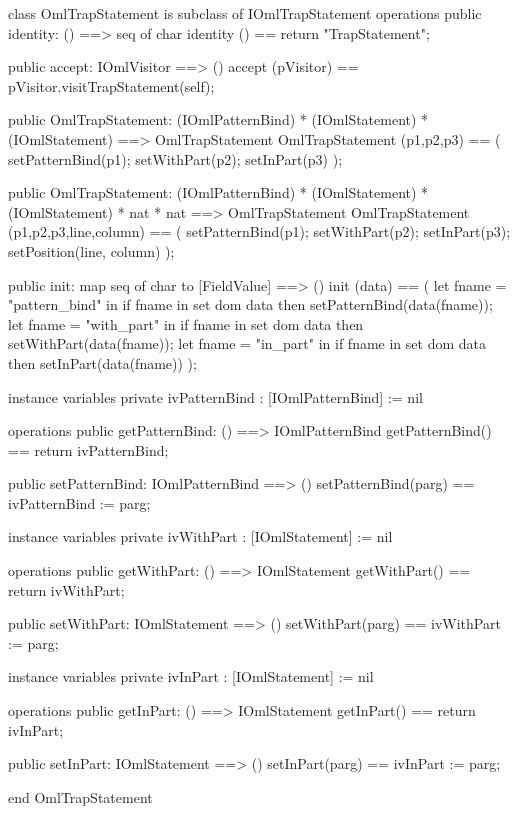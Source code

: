 \begin{vdm_al}
class OmlTrapStatement is subclass of IOmlTrapStatement
operations
  public identity: () ==> seq of char
  identity () == return "TrapStatement";

  public accept: IOmlVisitor ==> ()
  accept (pVisitor) == pVisitor.visitTrapStatement(self);

  public OmlTrapStatement:
    (IOmlPatternBind) *
    (IOmlStatement) *
    (IOmlStatement) ==> OmlTrapStatement
  OmlTrapStatement (p1,p2,p3) == 
    ( setPatternBind(p1);
      setWithPart(p2);
      setInPart(p3) );

  public OmlTrapStatement:
    (IOmlPatternBind) *
    (IOmlStatement) *
    (IOmlStatement) *
    nat *
    nat ==> OmlTrapStatement
  OmlTrapStatement (p1,p2,p3,line,column) == 
    ( setPatternBind(p1);
      setWithPart(p2);
      setInPart(p3);
      setPosition(line, column) );

  public init: map seq of char to [FieldValue] ==> ()
  init (data) ==
    ( let fname = "pattern_bind" in
        if fname in set dom data
        then setPatternBind(data(fname));
      let fname = "with_part" in
        if fname in set dom data
        then setWithPart(data(fname));
      let fname = "in_part" in
        if fname in set dom data
        then setInPart(data(fname)) );

instance variables
  private ivPatternBind : [IOmlPatternBind] := nil

operations
  public getPatternBind: () ==> IOmlPatternBind
  getPatternBind() == return ivPatternBind;

  public setPatternBind: IOmlPatternBind ==> ()
  setPatternBind(parg) == ivPatternBind := parg;

instance variables
  private ivWithPart : [IOmlStatement] := nil

operations
  public getWithPart: () ==> IOmlStatement
  getWithPart() == return ivWithPart;

  public setWithPart: IOmlStatement ==> ()
  setWithPart(parg) == ivWithPart := parg;

instance variables
  private ivInPart : [IOmlStatement] := nil

operations
  public getInPart: () ==> IOmlStatement
  getInPart() == return ivInPart;

  public setInPart: IOmlStatement ==> ()
  setInPart(parg) == ivInPart := parg;

end OmlTrapStatement
\end{vdm_al}

